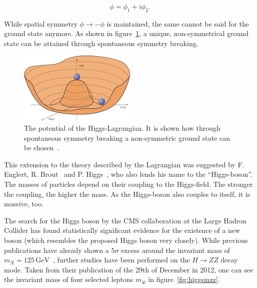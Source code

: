 \begin{equation}
  \label{eq:higgsimfield}
  \phi = \phi_1 + i \phi_2.
\end{equation}

\noindent While spatial symmetry $\phi \rightarrow - \phi$ is maintained, the same cannot be said for the ground state anymore. As shown in figure~\ref{fig:higgspotential}, a unique, non-symmetrical ground state can be attained through spontaneous symmetry breaking.

\begin{figure}[ht!]
  \centering
    \includegraphics[width=0.5\textwidth]{plots/higgspotential.jpg}
  \caption{The potential of the Higgs-Lagrangian. It is shown how through spontaneous symmetry breaking a non-symmetric ground state can be chosen~\cite{higgspotential}.}
  \label{fig:higgspotential}
\end{figure}


This extension to the theory described by the Lagrangian was suggested by F. Englert, R. Brout~\cite{higgs-englert} and P. Higgs~\cite{higgs-peter}, who also lends his name to the ``Higgs-boson''. The masses of particles depend on their coupling to the Higgs-field. The stronger the coupling, the higher the mass. As the Higgs-boson also couples to itself, it is massive, too.

The search for the Higgs boson by the CMS collaboration at the Large Hadron Collider has found statistically significant evidence for the existence of a new boson (which resembles the proposed Higgs boson very closely). While previous publications have already shown a $5 \sigma$ excess around the invariant mass of $m_X = 125\,\text{GeV}$~\cite{higgscls}, further studies have been performed on the $H \rightarrow ZZ$ decay mode. Taken from their publication of the 29th of December in 2012, one can see the invariant mass of four selected leptons $m_{4 l}$ in figure~\ref{fig:higgsmzz}.

